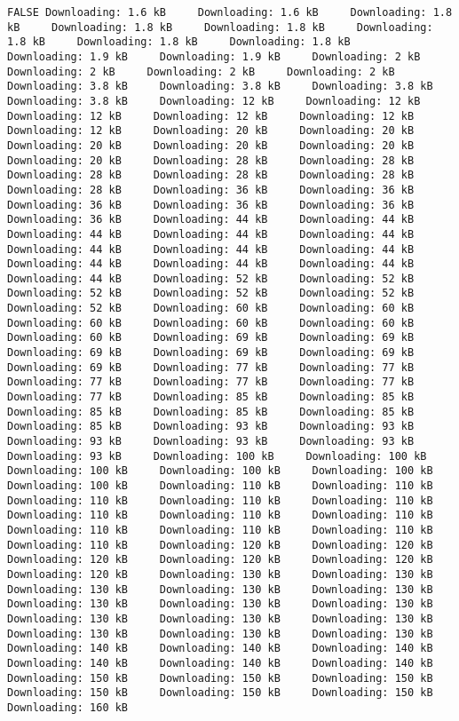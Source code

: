 \documentclass[
  12pt,
]{report}
\begin{document}
\begin{verbatim}
FALSE Downloading: 1.6 kB     Downloading: 1.6 kB     Downloading: 1.8 kB     Downloading: 1.8 kB     Downloading: 1.8 kB     Downloading: 1.8 kB     Downloading: 1.8 kB     Downloading: 1.8 kB     Downloading: 1.9 kB     Downloading: 1.9 kB     Downloading: 2 kB     Downloading: 2 kB     Downloading: 2 kB     Downloading: 2 kB     Downloading: 3.8 kB     Downloading: 3.8 kB     Downloading: 3.8 kB     Downloading: 3.8 kB     Downloading: 12 kB     Downloading: 12 kB     Downloading: 12 kB     Downloading: 12 kB     Downloading: 12 kB     Downloading: 12 kB     Downloading: 20 kB     Downloading: 20 kB     Downloading: 20 kB     Downloading: 20 kB     Downloading: 20 kB     Downloading: 20 kB     Downloading: 28 kB     Downloading: 28 kB     Downloading: 28 kB     Downloading: 28 kB     Downloading: 28 kB     Downloading: 28 kB     Downloading: 36 kB     Downloading: 36 kB     Downloading: 36 kB     Downloading: 36 kB     Downloading: 36 kB     Downloading: 36 kB     Downloading: 44 kB     Downloading: 44 kB     Downloading: 44 kB     Downloading: 44 kB     Downloading: 44 kB     Downloading: 44 kB     Downloading: 44 kB     Downloading: 44 kB     Downloading: 44 kB     Downloading: 44 kB     Downloading: 44 kB     Downloading: 44 kB     Downloading: 52 kB     Downloading: 52 kB     Downloading: 52 kB     Downloading: 52 kB     Downloading: 52 kB     Downloading: 52 kB     Downloading: 60 kB     Downloading: 60 kB     Downloading: 60 kB     Downloading: 60 kB     Downloading: 60 kB     Downloading: 60 kB     Downloading: 69 kB     Downloading: 69 kB     Downloading: 69 kB     Downloading: 69 kB     Downloading: 69 kB     Downloading: 69 kB     Downloading: 77 kB     Downloading: 77 kB     Downloading: 77 kB     Downloading: 77 kB     Downloading: 77 kB     Downloading: 77 kB     Downloading: 85 kB     Downloading: 85 kB     Downloading: 85 kB     Downloading: 85 kB     Downloading: 85 kB     Downloading: 85 kB     Downloading: 93 kB     Downloading: 93 kB     Downloading: 93 kB     Downloading: 93 kB     Downloading: 93 kB     Downloading: 93 kB     Downloading: 100 kB     Downloading: 100 kB     Downloading: 100 kB     Downloading: 100 kB     Downloading: 100 kB     Downloading: 100 kB     Downloading: 110 kB     Downloading: 110 kB     Downloading: 110 kB     Downloading: 110 kB     Downloading: 110 kB     Downloading: 110 kB     Downloading: 110 kB     Downloading: 110 kB     Downloading: 110 kB     Downloading: 110 kB     Downloading: 110 kB     Downloading: 110 kB     Downloading: 120 kB     Downloading: 120 kB     Downloading: 120 kB     Downloading: 120 kB     Downloading: 120 kB     Downloading: 120 kB     Downloading: 130 kB     Downloading: 130 kB     Downloading: 130 kB     Downloading: 130 kB     Downloading: 130 kB     Downloading: 130 kB     Downloading: 130 kB     Downloading: 130 kB     Downloading: 130 kB     Downloading: 130 kB     Downloading: 130 kB     Downloading: 130 kB     Downloading: 130 kB     Downloading: 130 kB     Downloading: 140 kB     Downloading: 140 kB     Downloading: 140 kB     Downloading: 140 kB     Downloading: 140 kB     Downloading: 140 kB     Downloading: 150 kB     Downloading: 150 kB     Downloading: 150 kB     Downloading: 150 kB     Downloading: 150 kB     Downloading: 150 kB     Downloading: 160 kB     
\end{verbatim}
\end{document}
